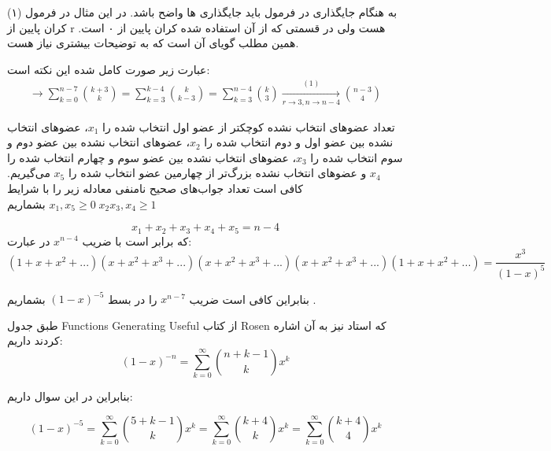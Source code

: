 \documentclass[11pt,largemargins]{h2wp}
\begin{document}
   
   
 \notes
 
 \Enote
   به هنگام جایگذاری در فرمول باید جایگذاری ها واضح باشد. در این مثال در فرمول (۱) کران پایین از r هست ولی در قسمتی که از آن استفاده شده کران پایین از ۰ است. همین مطلب گویای آن است که به توضیحات بیشتری نیاز هست. \label{sec:4} 
		
		عبارت زیر صورت کامل شده این نکته است:
		\begin{align*}
		\longrightarrow \sum_{k=0}^{n-7} \binom{k+3}{k} = \sum_{k=3}^{k-4} \binom{k}{k-3} = \sum_{k=3}^{n-4} \binom{k}{3} \xrightarrow[{r \rightarrow 3},{ n \rightarrow {n-4} }]{(1)} \binom{n-3}{4}
\end{align*}	



   تعداد عضو‌های  انتخاب نشده کوچکتر از عضو اول انتخاب شده را 
                $x_1$،
                عضوهای انتخاب نشده بین عضو اول و دوم انتخاب شده را
                $x_2$،
                عضو‌های انتخاب نشده بین عضو دوم و سوم انتخاب شده را
                $x_3$،
                عضو‌های انتخاب نشده بین عضو سوم و چهارم انتخاب شده را
                $x_4$ و
                عضوهای انتخاب نشده بزرگ‌تر از چهارمین عضو انتخاب شده را 
                $x_5$
                می‌گیریم. کافی است تعداد جواب‌های صحیح نامنفی معادله زیر را با شرایط 
                $x_1, x_5 \geq 0 \; x_2 x_3, x_4 \geq 1$
                بشماریم
               
                $$x_1 + x_2 + x_3 + x_4 + x_5 = n - 4$$
                که برابر است با ضریب
                $x^{n - 4}$
                در عبارت:\\
              
                $$(1 + x + x^2 + ...)(x + x^2 + x^3 + ...)(x + x^2 + x^3 + ...)(x + x^2 + x^3 + ...)(1 + x + x^2 + ...) = \frac{x^3}{(1 - x)^5}$$
                
                 بنابراین کافی است ضریب $x^{n - 7}$ را در بسط
                  $(1 - x)^{-5}$
         بشماریم . 
               
               
                   طبق جدول  
                  Functions Generating Useful
		از کتاب Rosen
		که استاد نیز به آن اشاره کردند داریم:\\
       
		    $$(1 - x) ^ {-n} = \sum_{k = 0}^{\infty} \binom{n + k - 1}{k} x^{k} $$

	    بنابراین در این سوال داریم:
                
                    $$(1 - x)^{-5} = \sum_{k = 0}^{\infty} \binom{5 + k - 1}{k}x^k
                    = \sum_{k = 0}^{\infty} \binom{k + 4}{k}x^k
                    = \sum_{k = 0}^{\infty} \binom{k + 4}{4}x^k$$
             
\end{document}
